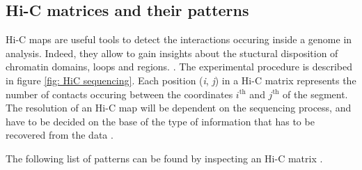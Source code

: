 \subsection{Hi-C matrices and their patterns} \label{chap: Hi-C matrices}

Hi-C maps are useful tools to detect the interactions occuring inside a genome in analysis. Indeed, they allow to gain insights about the stuctural disposition of chromatin domains, loops and regions.
\cite{lajoieHitchhikerGuideHiC2015}.
The experimental procedure is described in figure \ref{fig: HiC sequencing}. Each position (\textit{i}, \textit{j}) in a Hi-C matrix represents the number of contacts occuring between the coordinates $i^{\text{th}}$ and $j^{\text{th}}$ of the segment. The resolution of an Hi-C map will be dependent on the sequencing process, and have to be decided on the base of the type of information that has to be recovered from the data
\cite{lajoieHitchhikerGuideHiC2015}.

The following list of patterns can be found by inspecting an Hi-C matrix
\cite{distefanoHiCconstrainedPhysicalModels2016,lajoieHitchhikerGuideHiC2015}.

